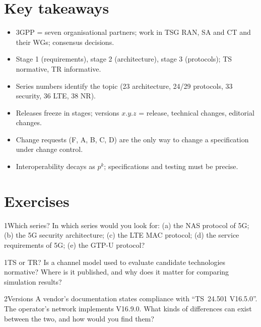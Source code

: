 \documentclass[11pt,a4paper]{article}
\begin{document}
\section{Key takeaways}
\begin{takeawaybox}
\begin{itemize}
  \item 3GPP = seven organisational partners; work in TSG RAN, SA and CT and their WGs; consensus decisions.
  \item Stage 1 (requirements), stage 2 (architecture), stage 3 (protocols); TS normative, TR informative.
  \item Series numbers identify the topic (23 architecture, 24/29 protocols, 33 security, 36 LTE, 38 NR).
  \item Releases freeze in stages; versions $x.y.z$ = release, technical changes, editorial changes.
  \item Change requests (F, A, B, C, D) are the only way to change a specification under change control.
  \item Interoperability decays as $p^k$; specifications and testing must be precise.
\end{itemize}
\end{takeawaybox}

\section{Exercises}

\begin{exercisebox}{1}{Which series?}\label{exr:series}
In which series would you look for: (a) the NAS protocol of 5G; (b) the 5G security architecture; (c) the LTE MAC protocol;
(d) the service requirements of 5G; (e) the GTP-U protocol?
\end{exercisebox}

\begin{exercisebox}{1}{TS or TR?}\label{exr:tstr}
Is a channel model used to evaluate candidate technologies normative? Where is it published, and why does it matter for
comparing simulation results?
\end{exercisebox}

\begin{exercisebox}{2}{Versions}\label{exr:version}
A vendor's documentation states compliance with ``TS~24.501 V16.5.0''. The operator's network implements V16.9.0. What
kinds of differences can exist between the two, and how would you find them?
\end{exercisebox}
\end{document}
